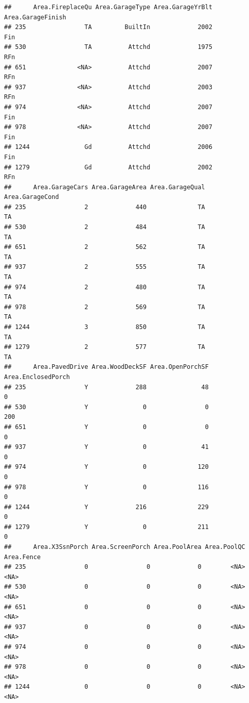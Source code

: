 \documentclass[]{article}
\begin{document}
\begin{verbatim}
##      Area.FireplaceQu Area.GarageType Area.GarageYrBlt Area.GarageFinish
## 235                TA         BuiltIn             2002               Fin
## 530                TA          Attchd             1975               RFn
## 651              <NA>          Attchd             2007               RFn
## 937              <NA>          Attchd             2003               RFn
## 974              <NA>          Attchd             2007               Fin
## 978              <NA>          Attchd             2007               Fin
## 1244               Gd          Attchd             2006               Fin
## 1279               Gd          Attchd             2002               RFn
##      Area.GarageCars Area.GarageArea Area.GarageQual Area.GarageCond
## 235                2             440              TA              TA
## 530                2             484              TA              TA
## 651                2             562              TA              TA
## 937                2             555              TA              TA
## 974                2             480              TA              TA
## 978                2             569              TA              TA
## 1244               3             850              TA              TA
## 1279               2             577              TA              TA
##      Area.PavedDrive Area.WoodDeckSF Area.OpenPorchSF Area.EnclosedPorch
## 235                Y             288               48                  0
## 530                Y               0                0                200
## 651                Y               0                0                  0
## 937                Y               0               41                  0
## 974                Y               0              120                  0
## 978                Y               0              116                  0
## 1244               Y             216              229                  0
## 1279               Y               0              211                  0
##      Area.X3SsnPorch Area.ScreenPorch Area.PoolArea Area.PoolQC Area.Fence
## 235                0                0             0        <NA>       <NA>
## 530                0                0             0        <NA>       <NA>
## 651                0                0             0        <NA>       <NA>
## 937                0                0             0        <NA>       <NA>
## 974                0                0             0        <NA>       <NA>
## 978                0                0             0        <NA>       <NA>
## 1244               0                0             0        <NA>       <NA>

\end{verbatim}
\end{document}
